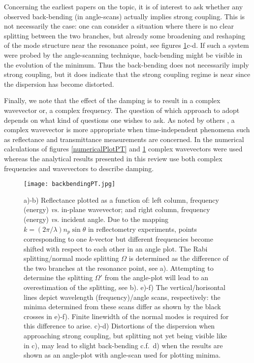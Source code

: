 \documentclass[12pt]{iopart}
\begin{document}
Concerning the earliest papers on the topic, it is of interest to ask whether any observed  back-bending (in angle-scans) actually implies strong coupling. This is not necessarily the case: one can consider a situation where there is no clear splitting between the two branches, but already some broadening and reshaping of the mode structure near the resonance point, see figures \ref{backbendingPT}c-d. If such a system were probed by the angle-scanning technique, back-bending might be visible in the evolution of the minimum. Thus the back-bending does not necessarily imply strong coupling, but it does indicate that the strong coupling regime is near since the dispersion has become distorted.   

Finally, we note that the effect of the damping is to result in a complex wavevector or, a complex frequency. The question of which approach to adopt depends on what kind of questions one wishes to ask. As noted by others \cite{LRandE, Archambault_PRB_2009_79_195414}, a complex wavevector is more appropriate when time-independent phenomena such as reflectance and transmittance measurements are concerned. In the numerical calculations of figures \ref{numericalPlotPT} and \ref{backbendingPT} complex wavevectors were used whereas the analytical results presented in this review use both complex frequencies and wavevectors to describe damping.


\begin{figure}
\texttt{[image: backbendingPT.jpg]}
\caption{a)-b) Reflectance plotted as a function of: left column, frequency (energy) {\it vs.} in-plane wavevector; and right column, frequency (energy) {\it vs.} incident angle. Due to the mapping $k= (2\pi/\lambda) n_p \sin \theta$ in reflectometry experiments, points corresponding to one $k$-vector but different frequencies become shifted with respect to each other in an angle plot. The Rabi splitting/normal mode splitting $\Omega$ is determined as the difference of the two branches at the resonance point, see a). Attempting to determine the splitting $\Omega'$ from the angle-plot will lead to an overestimation of the splitting, see b). e)-f) The vertical/horisontal lines depict wavelength (frequency)/angle scans, respectively: the minima determined from these scans differ as shown by the black crosses in e)-f). Finite linewidth of the normal modes is required for this difference to arise. c)-d) Distortions of the dispersion when approaching strong coupling, but splitting not yet being visible like in c), may lead to slight back-bending c.f.\ d) when the results are shown as an angle-plot with angle-scan used for plotting minima.} 
\label{backbendingPT}
\end{figure}
\end{document}
